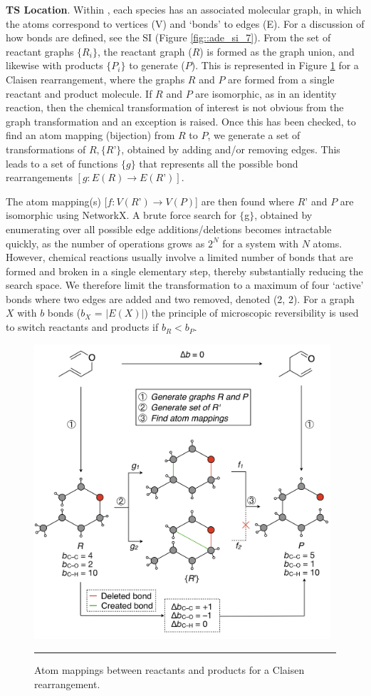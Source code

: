 \documentclass[../../main.tex]{subfiles}
\begin{document}
{\bfseries{TS Location}}. Within \ade, each species has an associated molecular graph, in which the atoms correspond to vertices (V) and ‘bonds’ to edges (E). For a discussion of how bonds are defined, see the SI (Figure \ref{fig::ade_si_7}). From the set of reactant graphs $\{R_i\}$, the reactant graph ($R$) is formed as the graph union, and likewise with products $\{P_i\}$ to generate ($P$). This is represented in Figure \ref{fig::ade_3} for a Claisen rearrangement, where the graphs $R$ and $P$ are formed from a single reactant and product molecule. If $R$ and $P$ are isomorphic, as in an identity reaction, then the chemical transformation of interest is not obvious from the graph transformation and an exception is raised. Once this has been checked, to find an atom mapping (bijection) from $R$ to $P$, we generate a set of transformations of $R, \{R’\}$, obtained by adding and/or removing edges. This leads to a set of functions $\{g\}$ that represents all the possible bond rearrangements $[g: E(R) \rightarrow E(R’)]$.


The atom mapping(s) [$f: V(R’) \rightarrow V(P)$] are then found where $R’$ and $P$ are isomorphic using NetworkX.\cite{NetworkX} A brute force search for $\{$g$\}$, obtained by enumerating over all possible edge additions/deletions becomes intractable quickly, as the number of operations grows as $2^N$ for a system with $N$ atoms. However, chemical reactions usually involve a limited number of bonds that are formed and broken in a single elementary step, thereby substantially reducing the search space. We therefore limit the transformation to a maximum of four ‘active’ bonds where two edges are added and two removed, denoted (2, 2). For a graph $X$ with $b$ bonds ($b_X$ = $|E(X)|$) the principle of microscopic reversibility is used to switch reactants and products if $b_R < b_P$. 


\begin{figure}[h!]
	\vspace{0.4cm}
	\centering
	\includegraphics[width=11cm]{5/autode/figs/fig3}
	\vspace{0.4cm}
	\hrule
	\caption{Atom mappings between reactants and products for a Claisen rearrangement.}
	\label{fig::ade_3}
\end{figure}
\end{document}
